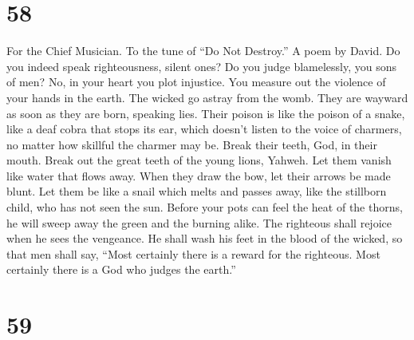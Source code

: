 \hypertarget{section-56}{%
\section{58}\label{section-56}}

For the Chief Musician. To the tune of ``Do Not Destroy.'' A poem by
David.  Do you indeed speak righteousness, silent ones? Do
you judge blamelessly, you sons of men?  No, in your heart
you plot injustice. You measure out the violence of your hands in the
earth.  The wicked go astray from the womb. They are wayward
as soon as they are born, speaking lies.  Their poison is
like the poison of a snake, like a deaf cobra that stops its ear,
 which doesn't listen to the voice of charmers, no matter
how skillful the charmer may be.  Break their teeth, God, in
their mouth. Break out the great teeth of the young lions, Yahweh.
 Let them vanish like water that flows away. When they draw
the bow, let their arrows be made blunt.  Let them be like a
snail which melts and passes away, like the stillborn child, who has not
seen the sun.  Before your pots can feel the heat of the
thorns, he will sweep away the green and the burning alike.
 The righteous shall rejoice when he sees the vengeance. He
shall wash his feet in the blood of the wicked,  so that
men shall say, ``Most certainly there is a reward for the righteous.
Most certainly there is a God who judges the earth.''

\hypertarget{section-57}{%
\section{59}\label{section-57}}

